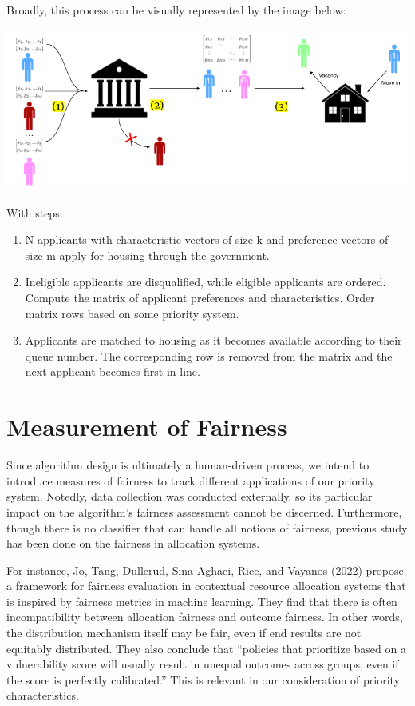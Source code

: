 \documentclass[11pt]{article}
\begin{document}
Broadly, this process can be visually represented by the image below:
\begin{center}
    \includegraphics[scale=0.44]{doc/Setup Image.png}
\end{center}
With steps:
\begin{enumerate}
    \item N applicants with characteristic vectors of size k and preference vectors of size m apply for housing through the government. 
    \item Ineligible applicants are disqualified, while eligible applicants are ordered. Compute the matrix of applicant preferences and characteristics. Order matrix rows based on some priority system.
    \item Applicants are matched to housing as it becomes available according to their queue number. The corresponding row is removed from the matrix and the next applicant becomes first in line.
\end{enumerate}

\section{Measurement of Fairness}

Since algorithm design is ultimately a human-driven process, we intend to introduce measures
of fairness to track different applications of our priority system. Notedly, data collection was conducted externally, so its particular impact on the algorithm’s fairness assessment cannot be discerned. Furthermore, though there is no classifier that can handle all notions of fairness, previous study has been done on the fairness in allocation systems.

For instance, Jo, Tang, Dullerud, Sina Aghaei, Rice, and Vayanos (2022) propose a framework
for fairness evaluation in contextual resource allocation systems that is inspired by fairness
metrics in machine learning. They find that there is often incompatibility between allocation
fairness and outcome fairness. In other words, the distribution mechanism itself may be fair,
even if end results are not equitably distributed. They also conclude that “policies that prioritize based on a vulnerability score will usually result in unequal outcomes across groups, even if the score is perfectly calibrated.” This is relevant in our consideration of priority characteristics.
\end{document}
